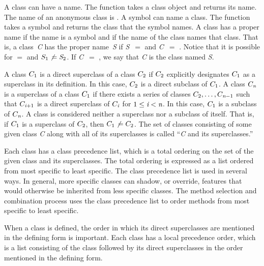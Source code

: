 A class can have a {\bit name}. The function  takes a
class object and returns its name. The name of an anonymous class is
.  A symbol can {\bit name\/} a class.  The function 
 takes a symbol and returns the class that the symbol
names. A class has a {\bit proper name\/} if the name is a symbol
and if the name of the class
names that class.  That is, a class~\emph{C} has the {\bit proper
name\/}~\emph{S} if \emph{S}~$=$  and \emph{C}~$=$ .  Notice that it is possible for 
$=$  and $S_ 1\not\,= \emph{S}_ 2$.
If \emph{C}~$=$ , we say that \emph{C} is the {\bit class named}
\emph{S}.

A class $C_{1}$ is a {\bit direct superclass\/} of a class
$C_{2}$ if $C_{2}$ explicitly designates $C_{1}$ as a
superclass in its definition.  In this case, $C_{2}$ is a {\bit
direct subclass\/} of $C_{1}$.  A class $C_{\hbox{\scriptsize\it n}}$ is a {\bit
superclass\/} of a class $C_{1}$ if there exists a series of
classes $C_{2},\ldots,C_{\hbox{\scriptsize\it n}-1}$
such that $C_{\hbox{\scriptsize\it i}+1}$ is a
direct superclass of $C_{\hbox{\scriptsize\it i}}$ for $1 \leq \emph{i} < \emph{n}$.  In this case, 
$C_{1}$ is a {\bit subclass\/} of $C_{\hbox{\scriptsize\it n}}$.  A class is
considered neither a superclass nor a subclass of itself.  That is, if
$C_{1}$ is a superclass of $C_{2}$, then $C_{1} \not\,=
C_{2}$.  The set of classes consisting of some given
class \emph{C} along with all of its superclasses is called ``\emph{C} and its
superclasses.''

Each class has a {\bit class precedence list}, which is a total ordering
on the set of the given class and its superclasses.  The total ordering
is expressed as a list ordered from most specific to least specific.
The class precedence list is used in several ways.  In general, more
specific classes can {\bit shadow}, or override, features that would
otherwise be inherited from less specific classes.  The method selection
and combination process uses the class precedence list to order methods
from most specific to least specific. 
 
When a class is defined, the order in which its direct superclasses
are mentioned in the defining form is important.  Each class has a
{\bit local precedence order\/}, which is a list consisting of the
class followed by its direct superclasses in the order mentioned
in the defining form.

